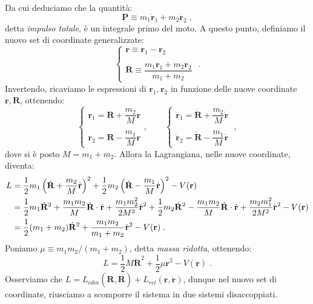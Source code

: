 Da cui deduciamo che la quantità:
\begin{equation}
\mathbf{P}\equiv m_1\dot{\mathbf{r}}_1+m_2\dot{\mathbf{r}}_2\;,
\end{equation}
detta \textit{impulso totale}, è un integrale primo del moto. A questo punto, definiamo il nuovo set di coordinate generalizzate:
\begin{equation}
\begin{cases}
\mathbf{r}\equiv \mathbf{r}_1-\mathbf{r}_2 \\
\\
\mathbf{R}\equiv \dfrac{m_1\mathbf{r}_1+m_2\mathbf{r}_2}{m_1+m_2}
\end{cases}\;.
\end{equation}
Invertendo, ricaviamo le espressioni di $\mathbf{r}_1,\mathbf{r}_2$ in funzione delle nuove coordinate $\mathbf{r},\mathbf{R}$, ottenendo:
\begin{equation*}
\begin{cases}
\mathbf{r}_1=\mathbf{R}+\dfrac{m_2}{M}\mathbf{r} \\
\\
\mathbf{r}_2=\mathbf{R}-\dfrac{m_1}{M}\mathbf{r}
\end{cases}, \qquad
\begin{cases}
\dot{\mathbf{r}}_1=\dot{\mathbf{R}}+\dfrac{m_2}{M}\dot{\mathbf{r}} \\
\\
\dot{\mathbf{r}}_2=\dot{\mathbf{R}}-\dfrac{m_1}{M}\dot{\mathbf{r}}
\end{cases}\;,
\end{equation*}
dove si è posto $M=m_1+m_2$. Allora la Lagrangiana, nelle nuove coordinate, diventa:
\begin{align}
L &= \frac{1}{2}m_1\left(\dot{\mathbf{R}}+\frac{m_2}{M}\dot{\mathbf{r}}\right)^2+\frac{1}{2}m_2\left(\dot{\mathbf{R}}-\frac{m_1}{M}\dot{\mathbf{r}}\right)^2-V(\mathbf{r})\notag  \\
&= \frac{1}{2}m_1\dot{\mathbf{R}}^2+\frac{m_1m_2}{M}\dot{\mathbf{R}}\cdot\dot{\mathbf{r}}+\frac{m_1m_2^2}{2M^2}\dot{\mathbf{r}}^2+\frac{1}{2}m_2\dot{\mathbf{R}}^2-\frac{m_1m_2}{M}\dot{\mathbf{R}}\cdot\dot{\mathbf{r}}+\frac{m_2m_1^2}{2M^2}\dot{\mathbf{r}}^2-V(\mathbf{r})\notag \\
&=\frac{1}{2}(m_1+m_2)\dot{\mathbf{R}}^2+\frac{m_1m_2}{m_1+m_2}\dot{\mathbf{r}}^2-V(\mathbf{r})\;.
\end{align}
Poniamo $\mu\equiv m_1m_2/(m_1+m_2)$, detta \textit{massa ridotta}, ottenendo:
\begin{equation}
L=\frac{1}{2}M\dot{\mathbf{R}}^2+\frac{1}{2}\mu\dot{\mathbf{r}}^2-V(\mathbf{r})\;.
\end{equation}
Osserviamo che $L=L_{cdm}(\mathbf{R},\dot{\mathbf{R}})+L_{rel}(\mathbf{r},\dot{\mathbf{r}})$, dunque nel nuovo set di coordinate, riusciamo a scomporre il sistema in due sistemi disaccoppiati. \\

